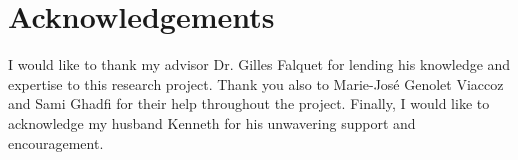 \chapter*{Acknowledgements}

 I would like to thank my advisor Dr. Gilles Falquet for lending his knowledge and expertise to this research project. Thank you also to Marie-José Genolet Viaccoz and Sami Ghadfi for their help throughout the project. Finally, I would like to acknowledge my husband Kenneth for his unwavering support and encouragement.
 
 
